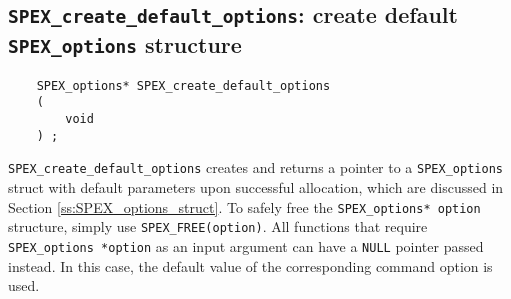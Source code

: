 \documentclass[12pt,oneside]{book}
\theoremstyle{definition}
\begin{document}
\subsection{\texttt{SPEX\_create\_default\_options}: create default \texttt{SPEX\_options} structure}
\label{ss:create_default_options}
\begin{mdframed}[userdefinedwidth=\textwidth]
{\footnotesize
\begin{verbatim}
    SPEX_options* SPEX_create_default_options
    (
        void
    ) ;
\end{verbatim}
} \end{mdframed}

\verb|SPEX_create_default_options| creates and returns a pointer to a
\verb|SPEX_options| struct with default parameters upon successful allocation,
which are discussed in Section \ref{ss:SPEX_options_struct}.  To safely free
the \verb|SPEX_options* option| structure, simply use \newline \verb|SPEX_FREE(option)|.
All functions that require \verb|SPEX_options *option| as an input argument can
have a \verb'NULL' pointer passed instead. In this case, the default value of
the corresponding command option is used. 
\end{document}
